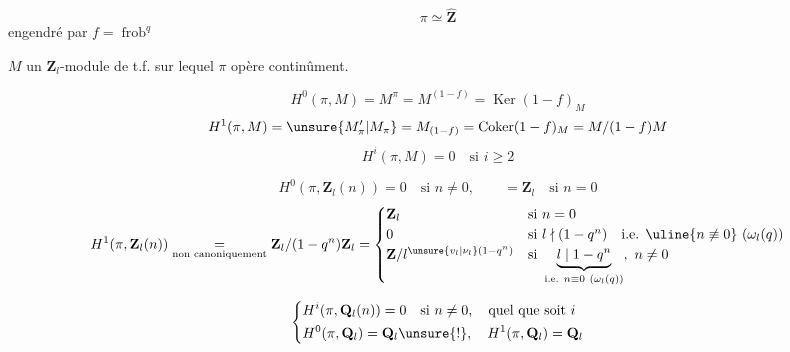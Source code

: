 

\[
\pi\simeq\widehat{\mathbf Z}
\]
engendré par $f=\operatorname{frob}^q$

$M$ un $\mathbf Z_l$-module de t.f. sur lequel $\pi$ opère continûment.

\[
H^0(\pi,M)=M^\pi=M^{(1-f)}=\operatorname{Ker}(1-f)_M
\]
\[
H^1(\pi,M)=\unsure{M'_\pi|M_\pi}=M_{(1-f)}=\operatorname{Coker}(1-f)_M=M/(1-f)M
\]
\[
H^i(\pi,M)=0\quad\text{si }i\geq2
\]

\[
H^0(\pi,\mathbf Z_l(n))=0\quad\text{si }n\neq0,\qquad=\mathbf Z_l\quad\text{si }n=0
\]
\[
H^1(\pi,\mathbf Z_l(n))\underset{\text{non canoniquement}}{=}
\mathbf Z_l/(1-q^n)\mathbf Z_l
=\begin{cases}
\mathbf Z_l&\text{si }n=0\\
0&\text{si }l\nmid(1-q^n)\quad\text{i.e. }\uline{n\not\equiv0}\ (\omega_l(q))\\
\mathbf Z/l^{\unsure{v_l|\nu_l}(1-q^n)}&\text{si }\underbrace{l\mid1-q^n}_{\text{i.e. }n\equiv0\ (\omega_l(q))},\ n\neq0
\end{cases}
\]

\[
\left\{\begin{aligned}
&H^i(\pi,\mathbf Q_l(n))=0\quad\text{si }n\neq0,\quad\text{quel que soit }i\\
&H^0(\pi,\mathbf Q_l)=\mathbf Q_l\unsure{!},\quad H^1(\pi,\mathbf Q_l)=\mathbf Q_l
\end{aligned}\right.
\]

